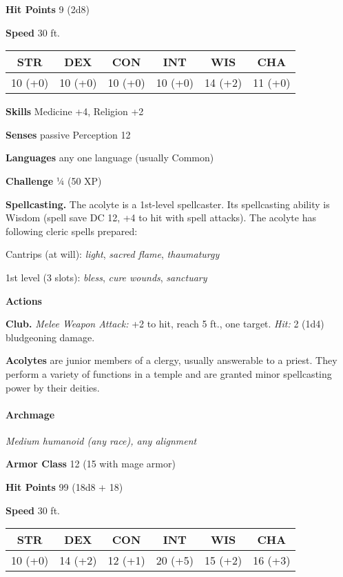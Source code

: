 \documentclass[
]{article}
\begin{document}
\textbf{Hit Points} 9 (2d8)

\textbf{Speed} 30 ft.

\begin{longtable}[]{@{}cccccc@{}}
\toprule
STR & DEX & CON & INT & WIS & CHA\tabularnewline
\midrule
\endhead
10 (+0) & 10 (+0) & 10 (+0) & 10 (+0) & 14 (+2) & 11 (+0)\tabularnewline
\bottomrule
\end{longtable}

\textbf{Skills} Medicine +4, Religion +2

\textbf{Senses} passive Perception 12

\textbf{Languages} any one language (usually Common)

\textbf{Challenge} ¼ (50 XP)

\textbf{Spellcasting.} The acolyte is a 1st-level spellcaster. Its
spellcasting ability is Wisdom (spell save DC 12, +4 to hit with spell
attacks). The acolyte has following cleric spells prepared:

Cantrips (at will): \emph{light}, \emph{sacred flame},
\emph{thaumaturgy}

1st level (3 slots): \emph{bless}, \emph{cure wounds}, \emph{sanctuary}

\textbf{Actions}

\textbf{Club.} \emph{Melee Weapon Attack:} +2 to hit, reach 5 ft., one
target. \emph{Hit:} 2 (1d4) bludgeoning damage.

\textbf{Acolytes} are junior members of a clergy, usually answerable to
a priest. They perform a variety of functions in a temple and are
granted minor spellcasting power by their deities.

\hypertarget{archmage}{%
\paragraph{Archmage}\label{archmage}}

\emph{Medium humanoid (any race), any alignment}

\textbf{Armor Class} 12 (15 with mage armor)

\textbf{Hit Points} 99 (18d8 + 18)

\textbf{Speed} 30 ft.

\begin{longtable}[]{@{}cccccc@{}}
\toprule
STR & DEX & CON & INT & WIS & CHA\tabularnewline
\midrule
\endhead
10 (+0) & 14 (+2) & 12 (+1) & 20 (+5) & 15 (+2) & 16 (+3)\tabularnewline
\bottomrule
\end{longtable}
\end{document}
